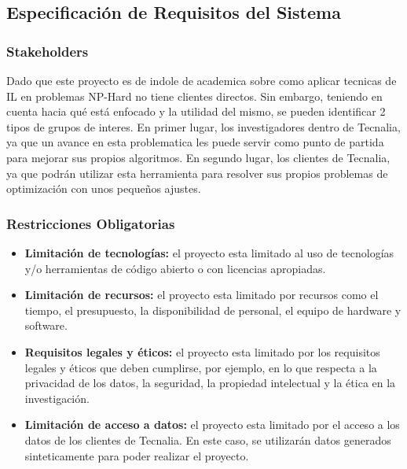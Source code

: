 \subsection{Especificación de Requisitos del Sistema}

\subsubsection{Stakeholders}
Dado que este proyecto es de indole de academica sobre como aplicar 
tecnicas de IL en problemas NP-Hard no tiene clientes directos. Sin embargo, 
teniendo en cuenta hacia qué está enfocado y la utilidad del mismo, se pueden 
identificar 2 tipos de grupos de interes. En primer lugar, los investigadores 
dentro de Tecnalia, ya que un avance en esta problematica les puede servir como punto de partida
para mejorar sus propios algoritmos. En segundo lugar, los clientes de Tecnalia,
ya que podrán utilizar esta herramienta para resolver sus propios problemas de
optimización con unos pequeños ajustes.

\subsubsection{Restricciones Obligatorias}
\begin{itemize}
    \item \textbf{Limitación de tecnologías:} el proyecto esta limitado al uso de
    tecnologías y/o herramientas de código abierto o con licencias apropiadas.
    \item \textbf{Limitación de recursos:} el proyecto esta limitado 
    por recursos como el tiempo, el presupuesto, la disponibilidad de personal, 
    el equipo de hardware y software.
    \item \textbf{Requisitos legales y éticos:} el proyecto esta limitado 
    por los requisitos legales y éticos que deben cumplirse, por ejemplo, en lo 
    que respecta a la privacidad de los datos, la seguridad, la propiedad intelectual 
    y la ética en la investigación.
    \item \textbf{Limitación de acceso a datos:} el proyecto esta limitado
    por el acceso a los datos de los clientes de Tecnalia. En este caso, se
    utilizarán datos generados sinteticamente para poder realizar el proyecto.
\end{itemize}


